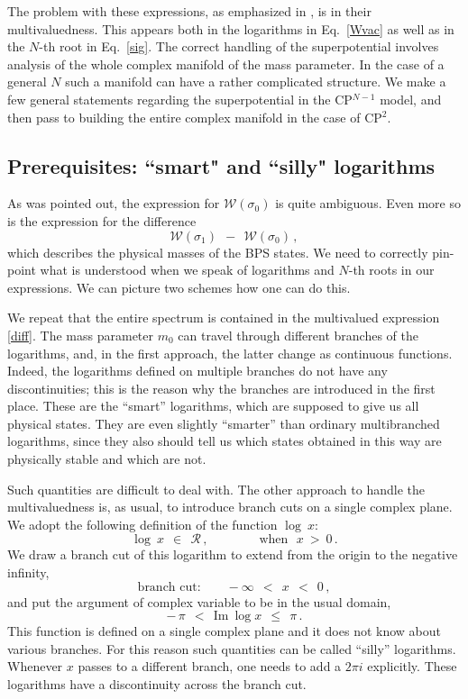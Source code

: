 \documentclass[epsfig,12pt]{article}
\def\beq{\begin{equation}}
\def\eeq{\end{equation}}
\def\beq{\begin{equation}}
\def\eeq{\end{equation}}
\newcommand{\mc}[1]{\mathcal{#1}}
\begin{document}
	The problem with these expressions, as emphasized in \cite{HaHo,SYtorkink,Bolokhov:2011mp}, is in their 
	multiva\-luedness.
	This appears both in the logarithms in Eq.~\eqref{Wvac} as well as in the $ N $-th root in Eq.~\eqref{sig}.
	The correct handling of the superpotential involves analysis of the whole complex manifold
	of the mass parameter.
	In the case of a general $ N $ such a manifold can have a rather complicated structure.
	We make a few general statements regarding the superpotential in the CP$^{N-1}$ model, and then pass
	to building the entire complex manifold in the case of CP$^2$.

\subsection{Prerequisites: ``smart" and ``silly" logarithms}

	As was pointed out, the expression for $ \mc{W}(\sigma_0) $ is quite ambiguous.
	Even more so is the expression for the difference
\beq
\label{diff}
	\mc{W}(\sigma_1) ~~-~~ \mc{W}(\sigma_0)\,,
\eeq
	which describes the physical masses of the BPS states.
	We need to correctly pin-point what is understood when we speak of logarithms 
	and $ N $-th roots in our expressions.
	We can picture two schemes how one can do this. 

	We repeat that the entire spectrum is contained in the multivalued expression \eqref{diff}.
	The mass parameter $ m_0 $ can travel through different branches of the logarithms, 
	and, in the first approach, the latter change as continuous functions.
	Indeed, the logarithms defined on multiple branches do not have any discontinuities;
	this is the reason why the branches are introduced in the first place. 
	These are the ``smart'' logarithms, which are supposed to give us all physical states. 
	They are even slightly ``smarter'' than ordinary multibranched logarithms, since they also should tell us
	which states  obtained in this way are physically stable and which are not. 

	Such quantities are difficult to deal with. 
	The other approach to handle the multivaluedness is, as usual, to introduce branch cuts on a single complex plane. 
	We adopt the following definition of the function $ \log~x $:
\beq
	\log~x ~~\in~~ \mc{R}\,, \qquad\qquad \text{when~~} x ~>~ 0\,.
\eeq
	We draw a branch cut of this logarithm to extend from the origin to the negative infinity,
\beq
	\text{branch cut:}\qquad -\infty ~~<~~ x ~~<~~ 0\,,
\eeq
	and put the argument of complex variable to be in the usual domain,
\beq
	-\,\pi ~~<~~  \text{Im}~\log x  ~~\leq~~ \pi\,.
\eeq
	This function is defined on a single complex plane and it does not know about various branches.
	For this reason such quantities can be called ``silly'' logarithms.
	Whenever $ x $ passes to a different branch, one needs to add a $ 2 \pi i $ explicitly.
	These logarithms have a discontinuity across the branch cut.
\end{document}
